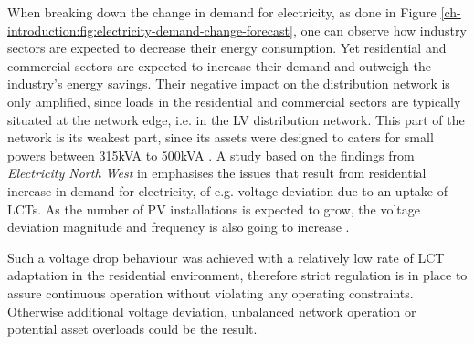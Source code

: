When breaking down the change in demand for electricity, as done in Figure \ref{ch-introduction:fig:electricity-demand-change-forecast}, one can observe how industry sectors are expected to decrease their energy consumption.
Yet residential and commercial sectors are expected to increase their demand and outweigh the industry's energy savings.
Their negative impact on the distribution network is only amplified, since loads in the residential and commercial sectors are typically situated at the network edge, i.e. in the LV distribution network.
This part of the network is its weakest part, since its assets were designed to caters for small powers between 315kVA to 500kVA \cite{EDS08-0115}.
A study based on the findings from \textit{Electricity North West} in \cite{ElectricityNorthWestLtd2014} emphasises the issues that result from residential increase in demand for electricity, of e.g. voltage deviation due to an uptake of LCTs.
As the number of PV installations is expected to grow, the voltage deviation magnitude and frequency is also going to increase \cite{Woyte2006}.
%
%

Such a voltage drop behaviour was achieved with a relatively low rate of LCT adaptation in the residential environment, therefore strict regulation is in place to assure continuous operation without violating any operating constraints.
Otherwise additional voltage deviation, unbalanced network operation or potential asset overloads could be the result.

